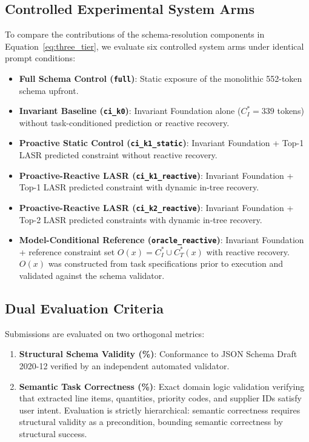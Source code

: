 \subsection{Controlled Experimental System Arms}
To compare the contributions of the schema-resolution components in Equation~\eqref{eq:three_tier}, we evaluate six controlled system arms under identical prompt conditions:
\begin{itemize}
    \item \textbf{Full Schema Control (\texttt{full})}: Static exposure of the monolithic 552-token schema upfront.
    \item \textbf{Invariant Baseline (\texttt{ci\_k0})}: Invariant Foundation alone ($C_I^* = 339$ tokens) without task-conditioned prediction or reactive recovery.
    \item \textbf{Proactive Static Control (\texttt{ci\_k1\_static})}: Invariant Foundation + Top-1 LASR predicted constraint without reactive recovery.
    \item \textbf{Proactive-Reactive LASR (\texttt{ci\_k1\_reactive})}: Invariant Foundation + Top-1 LASR predicted constraint with dynamic in-tree recovery.
    \item \textbf{Proactive-Reactive LASR (\texttt{ci\_k2\_reactive})}: Invariant Foundation + Top-2 LASR predicted constraints with dynamic in-tree recovery.
    \item \textbf{Model-Conditional Reference (\texttt{oracle\_reactive})}: Invariant Foundation + reference constraint set $O(x) = C_I^* \cup C_T^*(x)$ with reactive recovery. $O(x)$ was constructed from task specifications prior to execution and validated against the schema validator.
\end{itemize}

\subsection{Dual Evaluation Criteria}
Submissions are evaluated on two orthogonal metrics:
\begin{enumerate}
    \item \textbf{Structural Schema Validity (\%)}: Conformance to JSON Schema Draft 2020-12 verified by an independent automated validator.
    \item \textbf{Semantic Task Correctness (\%)}: Exact domain logic validation verifying that extracted line items, quantities, priority codes, and supplier IDs satisfy user intent. Evaluation is strictly hierarchical: semantic correctness requires structural validity as a precondition, bounding semantic correctness by structural success.
\end{enumerate}

